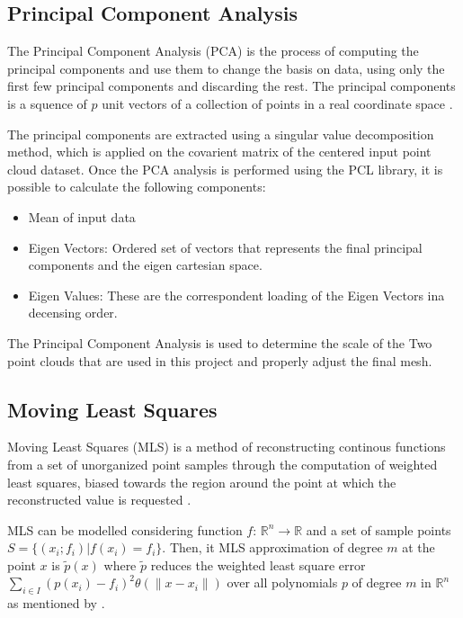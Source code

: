 \documentclass[12pt]{report}
\begin{document}
\subsection{Principal Component Analysis}
The Principal Component Analysis (PCA) is the process of computing the principal components and use them to change the basis on data, using only the first few principal components
and discarding the rest. The principal components is a squence of $p$ unit vectors of a collection of points in a real coordinate space .

The principal components are extracted using a singular value decomposition method, which is applied on the covarient matrix of the centered input point cloud dataset.
Once the PCA analysis is performed using the PCL library, it is possible to calculate the following components:
\begin{itemize}
  \item Mean of input data
  \item Eigen Vectors: Ordered set of vectors that represents the final principal components and the eigen cartesian space.
  \item Eigen Values: These are the correspondent loading of the Eigen Vectors ina decensing order.
\end{itemize}

The Principal Component Analysis is used to determine the scale of the Two point clouds that are used in this project and properly adjust the final mesh.

\subsection{Moving Least Squares }

Moving Least Squares (MLS) is a method of reconstructing continous functions from a set of unorganized point samples through the computation of weighted least squares, 
biased towards the region around the point at which the reconstructed value is requested .

MLS can be modelled considering function $f$: $\mathbb{R}^n \rightarrow \mathbb{R}$ and a set of sample points $S = \{ ( x_i ; f_i ) | f(x_i) = f_i\} $.
Then, it MLS approximation of degree $m$ at the point $x$ is $\tilde{p} (x)$ where $\tilde{p}$ reduces the weighted least square error
$\sum_{i \in I} (p(x_i)-f_i)^2 \theta (\| x-x_i\| )$ over all polynomials $p$ of degree $m$ in $\mathbb{R}^n$ as mentioned by .
\end{document}
